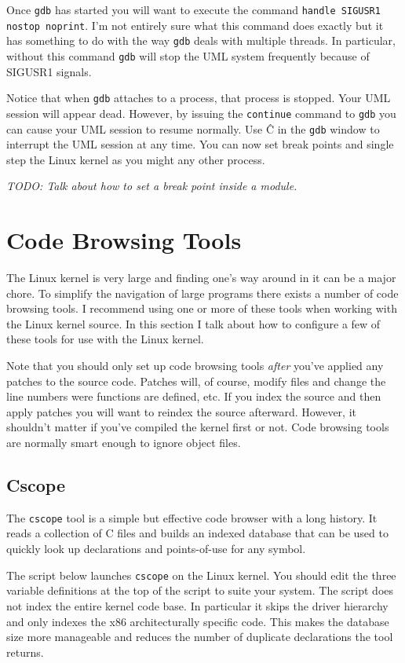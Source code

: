 \documentclass{article}
\newcommand{\command}[1]{\texttt{#1}}    %
\newcommand{\todo}[1]{\textit{TODO: #1}}
\begin{document}
Once \command{gdb} has started you will want to execute the command \command{handle SIGUSR1
  nostop noprint}. I'm not entirely sure what this command does exactly but it has something to
do with the way \command{gdb} deals with multiple threads. In particular, without this command
\command{gdb} will stop the UML system frequently because of SIGUSR1 signals.

Notice that when \command{gdb} attaches to a process, that process is stopped. Your UML session
will appear dead. However, by issuing the \command{continue} command to \command{gdb} you can
cause your UML session to resume normally. Use \^C in the \command{gdb} window to interrupt the
UML session at any time. You can now set break points and single step the Linux kernel as you
might any other process.

\todo{Talk about how to set a break point inside a module.}

\section{Code Browsing Tools}
\label{sec:code-browsing}

The Linux kernel is very large and finding one's way around in it can be a major chore. To
simplify the navigation of large programs there exists a number of code browsing tools. I
recommend using one or more of these tools when working with the Linux kernel source. In this
section I talk about how to configure a few of these tools for use with the Linux kernel.

Note that you should only set up code browsing tools \emph{after} you've applied any patches to
the source code. Patches will, of course, modify files and change the line numbers were
functions are defined, etc. If you index the source and then apply patches you will want to
reindex the source afterward. However, it shouldn't matter if you've compiled the kernel first
or not. Code browsing tools are normally smart enough to ignore object files.

\subsection{ Cscope}

The \command{cscope} tool is a simple but effective code browser with a long history. It reads a
collection of C files and builds an indexed database that can be used to quickly look up
declarations and points-of-use for any symbol.

The script below launches \command{cscope} on the Linux kernel. You should edit the three
variable definitions at the top of the script to suite your system. The script does not index
the entire kernel code base. In particular it skips the driver hierarchy and only indexes the
x86 architecturally specific code. This makes the database size more manageable and reduces the
number of duplicate declarations the tool returns.
\end{document}
